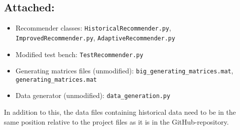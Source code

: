 \documentclass[a4paper]{article}
\begin{document}
\subsection*{Attached:}
\begin{itemize}
  \item Recommender classes: \texttt{HistoricalRecommender.py}, \texttt{ImprovedRecommender.py},
    \texttt{AdaptiveRecommender.py}
  \item Modified test bench: \texttt{TestRecommender.py}
  \item Generating matrices files (unmodified): \texttt{big\_generating\_matrices.mat}, \texttt{generating\_matrices.mat}
  \item Data generator (unmodified): \texttt{data\_generation.py}
\end{itemize}

In addition to this, the data files containing historical data need to be in the same position relative to the project files as it is in the GitHub-repository.
\end{document}
